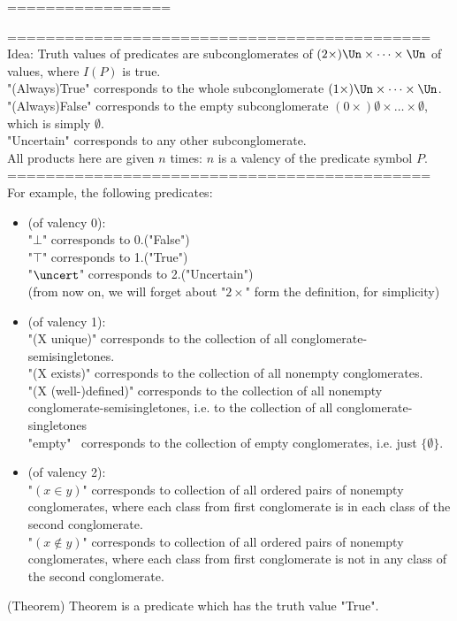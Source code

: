 =================


============================================\\
Idea: Truth values of predicates are subconglomerates of $(2\times)\Un\times\dots\times\Un$ of values, where $I(P)$ is true.\\
"(Always)True" corresponds to the whole subconglomerate $(1\times)\Un\times\dots\times\Un$.\\
"(Always)False" corresponds to the empty subconglomerate $(0\times)\emptyset\times\dots\times\emptyset$, which is simply $\emptyset$.\\
"Uncertain" corresponds to any other subconglomerate.\\
All products here are given $n$ times: $n$ is a valency of the predicate symbol $P$.
============================================\\

For example, the following predicates:\\
\begin{itemize}
\item (of valency 0):\\
"$\bot$" corresponds to 0.("False")\\
"$\top$" corresponds to 1.("True")\\
"$\uncert$" corresponds to 2.("Uncertain")\\
(from now on, we will forget about "$2\times$" form the definition, for simplicity)
\item (of valency 1):\\
"(X unique)" corresponds to the collection of all conglomerate-semisingletones.\\
"(X exists)" corresponds to the collection of all nonempty conglomerates.\\
"(X (well-)defined)" corresponds to the collection of all nonempty conglomerate-semisingletones, i.e. to the collection of all conglomerate-singletones\\
"empty" \ corresponds to the collection of empty conglomerates, i.e. just $\{\emptyset\}$.
\item (of valency 2):\\
"$(x\in y)$" corresponds to collection of all ordered pairs of nonempty conglomerates, where each class from first conglomerate is in each class of the second conglomerate.\\
"$(x\notin y)$" corresponds to collection of all ordered pairs of nonempty conglomerates, where each class from first conglomerate is not in any class of the second conglomerate.
\end{itemize}
\begin{definition}(Theorem)
Theorem is a predicate which has the truth value "True".\\
\end{definition}


